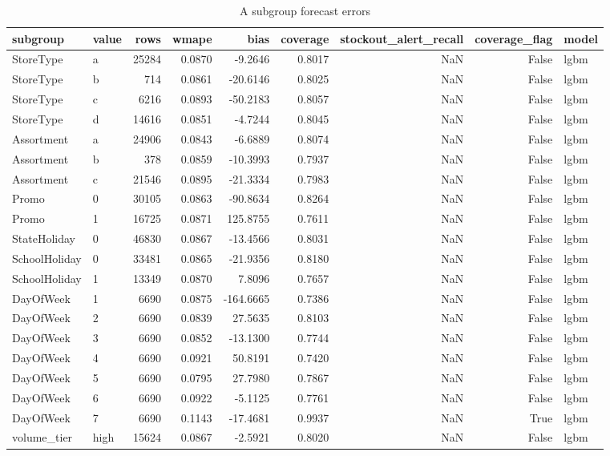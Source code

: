 \begin{table}
\caption{A subgroup forecast errors}
\label{tab:subgroup-errors-A}
\begin{tabular}{llrrrrrrl}
\toprule
subgroup & value & rows & wmape & bias & coverage & stockout\_alert\_recall & coverage\_flag & model \\
\midrule
StoreType & a & 25284 & 0.0870 & -9.2646 & 0.8017 & NaN & False & lgbm \\
StoreType & b & 714 & 0.0861 & -20.6146 & 0.8025 & NaN & False & lgbm \\
StoreType & c & 6216 & 0.0893 & -50.2183 & 0.8057 & NaN & False & lgbm \\
StoreType & d & 14616 & 0.0851 & -4.7244 & 0.8045 & NaN & False & lgbm \\
Assortment & a & 24906 & 0.0843 & -6.6889 & 0.8074 & NaN & False & lgbm \\
Assortment & b & 378 & 0.0859 & -10.3993 & 0.7937 & NaN & False & lgbm \\
Assortment & c & 21546 & 0.0895 & -21.3334 & 0.7983 & NaN & False & lgbm \\
Promo & 0 & 30105 & 0.0863 & -90.8634 & 0.8264 & NaN & False & lgbm \\
Promo & 1 & 16725 & 0.0871 & 125.8755 & 0.7611 & NaN & False & lgbm \\
StateHoliday & 0 & 46830 & 0.0867 & -13.4566 & 0.8031 & NaN & False & lgbm \\
SchoolHoliday & 0 & 33481 & 0.0865 & -21.9356 & 0.8180 & NaN & False & lgbm \\
SchoolHoliday & 1 & 13349 & 0.0870 & 7.8096 & 0.7657 & NaN & False & lgbm \\
DayOfWeek & 1 & 6690 & 0.0875 & -164.6665 & 0.7386 & NaN & False & lgbm \\
DayOfWeek & 2 & 6690 & 0.0839 & 27.5635 & 0.8103 & NaN & False & lgbm \\
DayOfWeek & 3 & 6690 & 0.0852 & -13.1300 & 0.7744 & NaN & False & lgbm \\
DayOfWeek & 4 & 6690 & 0.0921 & 50.8191 & 0.7420 & NaN & False & lgbm \\
DayOfWeek & 5 & 6690 & 0.0795 & 27.7980 & 0.7867 & NaN & False & lgbm \\
DayOfWeek & 6 & 6690 & 0.0922 & -5.1125 & 0.7761 & NaN & False & lgbm \\
DayOfWeek & 7 & 6690 & 0.1143 & -17.4681 & 0.9937 & NaN & True & lgbm \\
volume\_tier & high & 15624 & 0.0867 & -2.5921 & 0.8020 & NaN & False & lgbm \\

\end{tabular}
\end{table}
